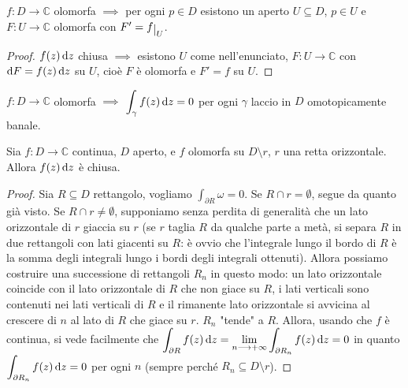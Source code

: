 \begin{cor}
  $f:D \longrightarrow \mathbb{C}$ olomorfa $\implies$ per ogni $p \in D$ esistono un aperto $U \subseteq D$, $p \in U$ e $F:U \longrightarrow \mathbb{C}$ olomorfa con $F'=f\restrict{U}$.
\end{cor}

\begin{proof}
  $f(z)\mathop{}\!\mathrm{d} z$ chiusa $\implies$ esistono $U$ come nell'enunciato, $F:U \longrightarrow \mathbb{C}$ con  $\mathop{}\!\mathrm{d} F=f(z)\mathop{}\!\mathrm{d} z$ su $U$, cioè $F$ è olomorfa e $F'=f$ su $U$.
\end{proof}

\begin{cor}
  $f:D \longrightarrow \mathbb{C}$ olomorfa $\implies$ $\displaystyle \int_{\gamma} f(z)\mathop{}\!\mathrm{d} z=0$ per ogni $\gamma$ laccio in $D$ omotopicamente banale.
\end{cor}

\begin{prop}
  Sia $f:D \longrightarrow \mathbb{C}$ continua, $D$ aperto, e $f$ olomorfa su $D \setminus r$, $r$ una retta orizzontale. Allora $f(z)\mathop{}\!\mathrm{d} z$ è chiusa.
\end{prop}

\begin{proof}
  Sia $R \subseteq D$ rettangolo, vogliamo $\displaystyle \int_{\partial R} \omega=0$. Se $R \cap r=\emptyset$, segue da quanto già visto. Se $R \cap r\not=\emptyset$, supponiamo senza perdita di generalità che un lato orizzontale di $r$ giaccia su $r$ (se $r$ taglia $R$ da qualche parte a metà, si separa $R$ in due rettangoli con lati giacenti su $R$: è ovvio che l'integrale lungo il bordo di $R$ è la somma degli integrali lungo i bordi degli integrali ottenuti). Allora possiamo costruire una successione di rettangoli $R_n$ in questo modo: un lato orizzontale coincide con il lato orizzontale di $R$ che non giace su $R$, i lati verticali sono contenuti nei lati verticali di $R$ e il rimanente lato orizzontale si avvicina al crescere di $n$ al lato di $R$ che giace su $r$.
  $R_n$ "tende" a $R$. Allora, usando che $f$ è continua, si vede facilmente che $\displaystyle \int_{\partial R} f(z)\mathop{}\!\mathrm{d} z=\lim_{n \longrightarrow +\infty} \int_{\partial R_n} f(z)\mathop{}\!\mathrm{d} z=0$ in quanto $\displaystyle \int_{\partial R_n} f(z)\mathop{}\!\mathrm{d} z=0$ per ogni $n$ (sempre perché $R_n \subseteq D \setminus r$).
\end{proof}
